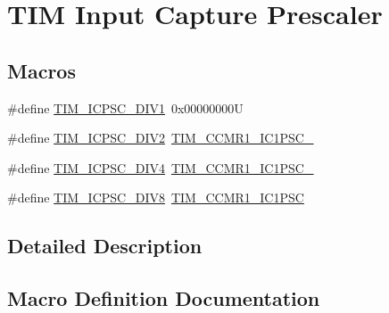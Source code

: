\hypertarget{group___t_i_m___input___capture___prescaler}{}\section{T\+IM Input Capture Prescaler}
\label{group___t_i_m___input___capture___prescaler}
\subsection*{Macros}
\begin{DoxyCompactItemize}
\item 
\#define \mbox{\hyperlink{group___t_i_m___input___capture___prescaler_ga8acb44abe3147d883685c1f9f1ce410e}{T\+I\+M\+\_\+\+I\+C\+P\+S\+C\+\_\+\+D\+I\+V1}}~0x00000000U
\item 
\#define \mbox{\hyperlink{group___t_i_m___input___capture___prescaler_ga1d8a7b66add914e2ddd910d2d700978f}{T\+I\+M\+\_\+\+I\+C\+P\+S\+C\+\_\+\+D\+I\+V2}}~\mbox{\hyperlink{group___peripheral___registers___bits___definition_ga05673358a44aeaa56daefca67341b29d}{T\+I\+M\+\_\+\+C\+C\+M\+R1\+\_\+\+I\+C1\+P\+S\+C\+\_}}
\item 
\#define \mbox{\hyperlink{group___t_i_m___input___capture___prescaler_gaf5a675046430fa0f0c95b0dac612828f}{T\+I\+M\+\_\+\+I\+C\+P\+S\+C\+\_\+\+D\+I\+V4}}~\mbox{\hyperlink{group___peripheral___registers___bits___definition_gaf42b75da9b2f127dca98b6ca616f7add}{T\+I\+M\+\_\+\+C\+C\+M\+R1\+\_\+\+I\+C1\+P\+S\+C\+\_}}
\item 
\#define \mbox{\hyperlink{group___t_i_m___input___capture___prescaler_ga5086cb03c89a5c67b199d20b605f00cb}{T\+I\+M\+\_\+\+I\+C\+P\+S\+C\+\_\+\+D\+I\+V8}}~\mbox{\hyperlink{group___peripheral___registers___bits___definition_gab46b7186665f5308cd2ca52acfb63e72}{T\+I\+M\+\_\+\+C\+C\+M\+R1\+\_\+\+I\+C1\+P\+SC}}
\end{DoxyCompactItemize}


\subsection{Detailed Description}


\subsection{Macro Definition Documentation}
\mbox{\label{group___t_i_m___input___capture___prescaler_ga8acb44abe3147d883685c1f9f1ce410e}} 
